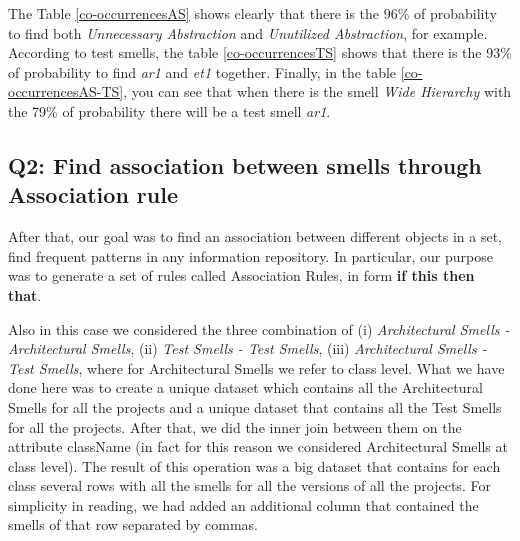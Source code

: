 \begin{table}[!ht]
\caption{Co-occurrences Architectural Smell - Test Smell in \emph{Apollo} project.}\label{co-occurrencesAS-TS}
\end{table}\mbox{}



The Table \ref{co-occurrencesAS} shows clearly that there is the 96\% of probability to find both \emph{Unnecessary Abstraction} and \emph{Unutilized Abstraction}, for example. According to test smells, the table \ref{co-occurrencesTS} shows that there is the 93\% of probability to find \emph{ar1} and \emph{et1} together. Finally, in the table \ref{co-occurrencesAS-TS}, you can see that when there is the smell \emph{Wide Hierarchy} with the 79\% of probability there will be a test smell \emph{ar1}.
\par\hfill

\subsection{Q2: Find association between smells through Association rule}
After that, our goal was to find an association between different objects in a set, find frequent patterns in any information repository. In particular, our purpose was to generate a set of rules called Association Rules, in form \textbf{if this then that}.

Also in this case we considered the three combination of (i) \textit{Architectural Smells - Architectural Smells}, (ii) \textit{Test Smells - Test Smells}, (iii) \textit{Architectural Smells - Test Smells}, where for Architectural Smells we refer to class level.
What we have done here was to create a unique dataset which contains all the Architectural Smells for all the projects and a unique dataset that contains all the Test Smells for all the projects. After that, we did the inner join between them on the attribute className (in fact for this reason we considered Architectural Smells at class level). The result of this operation was a big dataset that contains for each class several rows with all the smells for all the versions of all the projects. For simplicity in reading, we had added an additional column that contained the smells of that row separated by commas.

